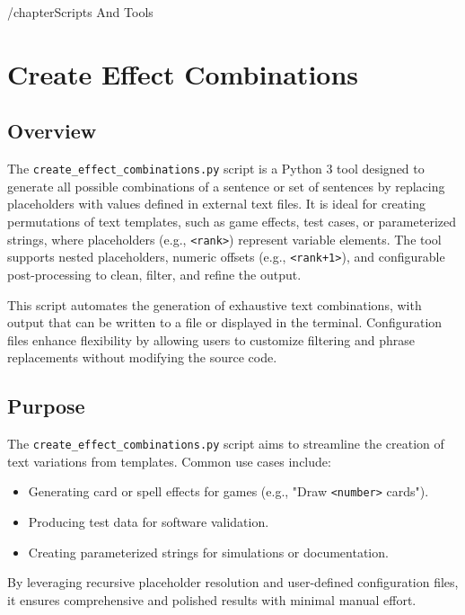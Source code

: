 /chapter{Scripts And Tools}






\section{Create Effect Combinations}
\subsection{Overview}
The \texttt{create\_effect\_combinations.py} script is a Python 3 tool designed to generate all possible combinations of a sentence or set of sentences by replacing placeholders with values defined in external text files. It is ideal for creating permutations of text templates, such as game effects, test cases, or parameterized strings, where placeholders (e.g., \texttt{<rank>}) represent variable elements. The tool supports nested placeholders, numeric offsets (e.g., \texttt{<rank+1>}), and configurable post-processing to clean, filter, and refine the output.

This script automates the generation of exhaustive text combinations, with output that can be written to a file or displayed in the terminal. Configuration files enhance flexibility by allowing users to customize filtering and phrase replacements without modifying the source code.

\subsection{Purpose}
The \texttt{create\_effect\_combinations.py} script aims to streamline the creation of text variations from templates. Common use cases include:
\begin{itemize}
    \item Generating card or spell effects for games (e.g., "Draw \texttt{<number>} cards").
    \item Producing test data for software validation.
    \item Creating parameterized strings for simulations or documentation.
\end{itemize}
By leveraging recursive placeholder resolution and user-defined configuration files, it ensures comprehensive and polished results with minimal manual effort.

